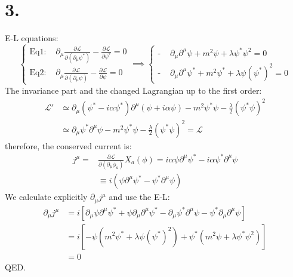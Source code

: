 \documentclass{article}
\newcommand{\pd}{\partial}  %
\newcommand{\pdm}{\partial_\mu}  %
\newcommand{\pdup}{\partial^\mu}  %
\newcommand{\Lag}{\mathcal{L}}  %
\begin{document}
\section*{3.}
E-L equations:
\begin{equation}
    \begin{cases}
         \text{Eq1: }& \pdm \frac{\pd \Lag}{\pd (\pdm \psi^*)} - \frac{\pd \Lag}{\pd \psi^*} = 0\\
         \text{Eq2: }& \pdm \frac{\pd \Lag}{\pd (\pdm \psi)} - \frac{\pd \Lag}{\pd \psi} = 0
    \end{cases}
    \implies 
    \begin{cases}
        \text{- }& \pdm \pdup \psi + m^2 \psi + \lambda \psi^*\psi^2 = 0 \\
        \text{- }& \pdm \pdup \psi^* + m^2 \psi^* + \lambda \psi(\psi^*)^2 = 0 
    \end{cases}
\end{equation}
The invariance part and the changed Lagrangian up to the first order:
\begin{equation}
    \begin{split}
    \Lag' & \simeq \pdm (\psi^* -i\alpha\psi^*) \pdup (\psi + i\alpha\psi)-m^2\psi^*\psi -\frac{\lambda}{2}(\psi^*\psi)^2 \\
        & \simeq \pdm\psi^* \pdup\psi -m^2\psi^*\psi -\frac{\lambda}{2}(\psi^*\psi)^2 = \Lag
    \end{split} 
\end{equation}
therefore, the conserved current is:
\begin{equation}
    \begin{split}
    j^\mu = &\frac{\pd \Lag }{\pd (\pdm\phi_a)}X_a(\phi) = i\alpha\psi\pdup\psi^* - i\alpha\psi^*\pdup\psi \\
    & \equiv i(\psi\pdup\psi^* - \psi^*\pdup\psi)
    \end{split}
\end{equation}
We calculate explicitly $\pdm j^\mu$ and use the E-L:
\begin{equation}
    \begin{split}
        \pdm j^\mu & = i\left[ \pdm\psi\pdup\psi^* + \psi\pdm\pdup\psi^* - \pdm\psi^* \pdup\psi - \psi^* \pdm\pdup\psi \right]\\
        & = i\left[ -\psi\left(m^2\psi^* + \lambda\psi (\psi^*)^2 \right) + \psi^*(m^2\psi + \lambda\psi^*\psi^2) \right] \\
        & = 0
    \end{split}
\end{equation}
QED.
\end{document}

